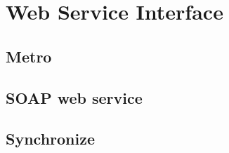 
\chapter{Web Service Interface}
\label{sec:WebServiceInterface}

\section{Metro}

\section{SOAP web service}

\section{Synchronize}

